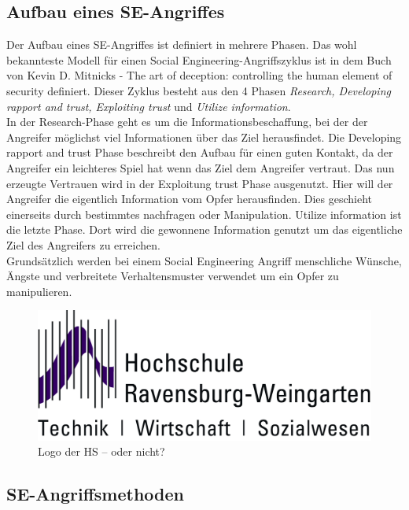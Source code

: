 	\subsection{Aufbau eines SE-Angriffes}
	Der Aufbau eines SE-Angriffes ist definiert in mehrere Phasen. Das wohl bekannteste Modell für einen Social Engineering-Angriffszyklus ist in dem Buch von Kevin D. Mitnicks - The art of deception: controlling the human element of security \cite{ArtOfDeception} definiert. Dieser Zyklus besteht aus den 4 Phasen \textit{Research, Developing rapport and trust, Exploiting trust} und \textit{Utilize information}.\\
	In der Research-Phase geht es um die Informationsbeschaffung, bei der der Angreifer möglichst viel Informationen über das Ziel herausfindet. Die Developing rapport and trust Phase beschreibt den Aufbau für einen guten Kontakt, da der Angreifer ein leichteres Spiel hat wenn das Ziel dem Angreifer vertraut. Das nun erzeugte Vertrauen wird in der Exploitung trust Phase ausgenutzt. Hier will der Angreifer die eigentlich Information vom Opfer herausfinden. Dies geschieht einerseits durch bestimmtes nachfragen oder Manipulation. Utilize information ist die letzte Phase. Dort wird die gewonnene Information genutzt um das eigentliche Ziel des Angreifers zu erreichen.\\
	Grundsätzlich werden bei einem Social Engineering Angriff menschliche Wünsche, Ängste und verbreitete Verhaltensmuster verwendet um ein Opfer zu manipulieren.\cite{LeitfadenSE}\\
		\FloatBarrier
		\begin{figure}
			\begin{center}
				\includegraphics*{bilder/HSLogoWGd}
				\caption{Logo der HS -- oder nicht?}
				\label{fig:logo}
			\end{center}
		\end{figure}
	\subsection{SE-Angriffsmethoden}
